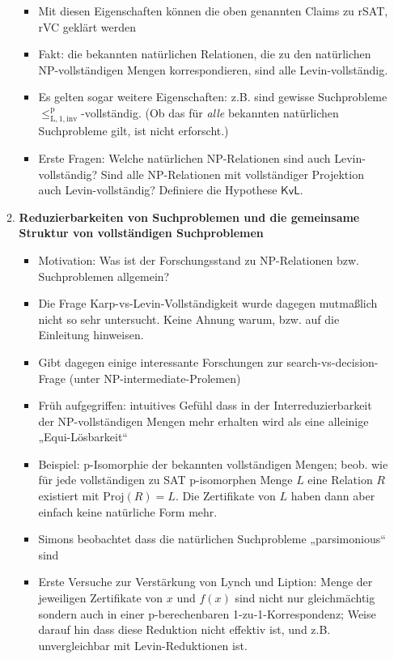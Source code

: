 \documentclass[nofonts]{uebung}
\begin{document}
\begin{enumerate}[label*=\arabic*.]
\begin{enumerate}[label*=\arabic*.]
\begin{itemize}
                    \item Mit diesen Eigenschaften können die oben genannten Claims zu rSAT, rVC geklärt werden
                    \item Fakt: die bekannten natürlichen Relationen, die zu den natürlichen NP-vollständigen Mengen korrespondieren, sind alle Levin-vollständig.
                    \item Es gelten sogar weitere Eigenschaften: z.B. sind gewisse Suchprobleme $\leq_\mathrm{L,1,inv}^\mathrm p$-vollständig. (Ob das für \emph{alle} bekannten natürlichen Suchprobleme gilt, ist nicht erforscht.)
                    \item Erste Fragen: Welche natürlichen NP-Relationen sind auch Levin-vollständig? Sind alle NP-Relationen mit vollständiger Projektion auch Levin-vollständig? Definiere die Hypothese $\mathsf{KvL}$.
                \end{itemize}
            \item \textbf{Reduzierbarkeiten von Suchproblemen und die gemeinsame Struktur von vollständigen Suchproblemen}
                \begin{itemize}
                    \item Motivation: Was ist der Forschungsstand zu NP-Relationen bzw. Suchproblemen allgemein?
                    \item Die Frage Karp-vs-Levin-Vollständigkeit wurde dagegen mutmaßlich nicht so sehr untersucht. Keine Ahnung warum, bzw. auf die Einleitung hinweisen.
                    \item Gibt dagegen einige interessante Forschungen zur search-vs-decision-Frage (unter NP-intermediate-Prolemen)
                    \item Früh aufgegriffen: intuitives Gefühl dass in der Interreduzierbarkeit der NP-vollständigen Mengen mehr erhalten wird als eine alleinige „Equi-Lösbarkeit“
                    \item Beispiel: p-Isomorphie der bekannten vollständigen Mengen; beob. wie für jede vollständigen zu SAT p-isomorphen Menge $L$ eine Relation $R$ existiert mit $\mathrm{Proj}(R)=L$. Die Zertifikate von $L$ haben dann aber einfach keine natürliche Form mehr.
                    \item Simons beobachtet dass die natürlichen Suchprobleme „parsimonious“ sind
                    \item Erste Versuche zur Verstärkung von  Lynch und Liption: Menge der jeweiligen Zertifikate von $x$ und $f(x)$ sind nicht nur gleichmächtig sondern auch in einer p-berechenbaren 1-zu-1-Korrespondenz; Weise darauf hin dass diese Reduktion nicht effektiv ist, und z.B. unvergleichbar mit Levin-Reduktionen ist.

\end{itemize}
\end{enumerate}
\end{enumerate}
\end{document}
